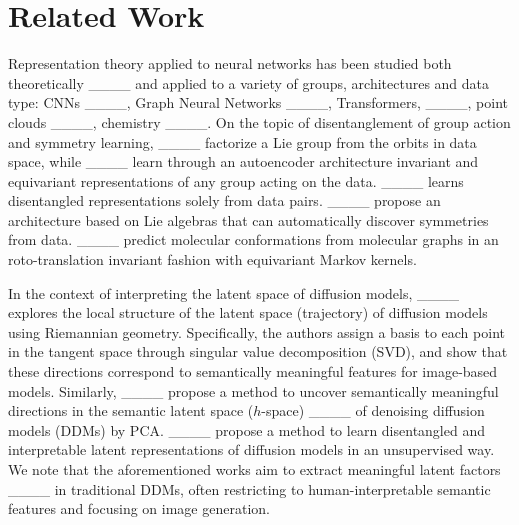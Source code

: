 \section{Related Work}
Representation theory applied to neural networks has been studied both theoretically ____ and applied to a variety of groups, architectures and data type: CNNs ____, Graph Neural Networks ____, Transformers,  ____, point clouds ____, 
chemistry ____.
On the topic of disentanglement of group action and symmetry learning, ____ factorize a Lie group from the orbits in data space,
while ____ learn through an autoencoder architecture invariant and equivariant representations of any group acting on the data. 
____ learns disentangled representations solely from data pairs.
____ propose an architecture based on Lie algebras that can automatically discover symmetries from data.
____ predict molecular conformations from molecular graphs
in an roto-translation invariant fashion with equivariant Markov kernels.

In the context of interpreting the latent space of diffusion models, ____ explores the local structure of the latent space (trajectory) of diffusion models using Riemannian geometry. Specifically, the authors assign a basis to each point in the tangent space through singular value decomposition (SVD), and show that these directions correspond to semantically meaningful features for image-based models. 
Similarly, ____ propose a method to uncover semantically meaningful directions in the semantic latent space ($h$-space) ____ of denoising diffusion models (DDMs) by PCA. ____ propose a method to  learn disentangled and interpretable latent representations of diffusion models in an unsupervised way. 
We note that the aforementioned works aim to extract meaningful latent factors ____ in traditional DDMs, often restricting to human-interpretable semantic features and focusing on image generation.

